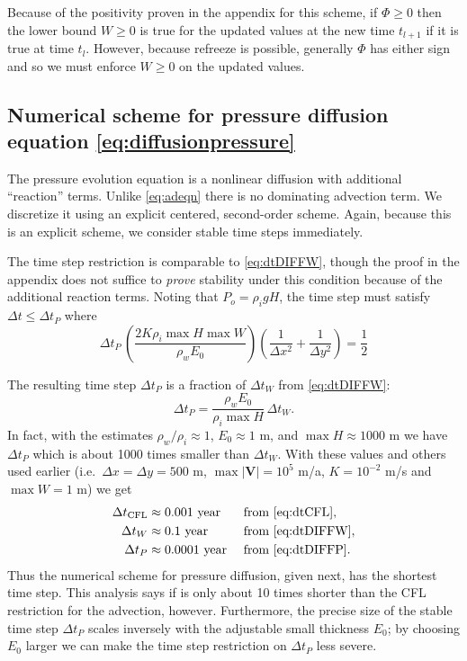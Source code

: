 \documentclass[11pt,final]{amsart}%
\newcommand\bV{\mathbf{V}}
\begin{document}
Because of the positivity proven in the appendix for this scheme, if $\Phi\ge 0$ then the lower bound $W\ge 0$ is true for the updated values at the new time $t_{l+1}$ if it is true at time $t_l$.  However, because refreeze is possible, generally $\Phi$ has either sign and so we must enforce $W\ge 0$ on the updated values.

\subsection*{Numerical scheme for pressure diffusion equation \eqref{eq:diffusionpressure}}  The pressure evolution equation is a nonlinear diffusion with additional ``reaction'' terms.  Unlike \eqref{eq:adeqn} there is no dominating advection term.  We discretize it using an explicit centered, second-order scheme.  Again, because this is an explicit scheme, we consider stable time steps immediately.

The time step restriction is comparable to \eqref{eq:dtDIFFW}, though the proof in the appendix does not suffice to \emph{prove} stability under this condition because of the additional reaction terms.  Noting that $P_o=\rho_i g H$, the time step must satisfy $\Delta t \le \Delta t_P$ where
\begin{equation}
\Delta t_P\, \left(\frac{2 K \rho_i \max H \max W}{\rho_w E_0}\right) \left(\frac{1}{\Delta x^2} + \frac{1}{\Delta y^2}\right) = \frac{1}{2} \label{eq:dtDIFFP}
\end{equation}

The resulting time step $\Delta t_P$ is a fraction of $\Delta t_W$ from \eqref{eq:dtDIFFW}:
\begin{equation}
\Delta t_P = \frac{\rho_w E_0}{\rho_i \max H}\, \Delta t_W.
\end{equation}
In fact, with the estimates $\rho_w/\rho_i \approx 1$, $E_0\approx 1$ m, and $\max H \approx 1000$ m we have $\Delta t_P$ which is about 1000 times smaller than $\Delta t_W$.  With these values and others used earlier (i.e.~$\Delta x = \Delta y = 500$ m, $\max |\bV|=10^5$ m/a, $K=10^{-2}$ m/s and $\max W=1$ m) we get
\begin{align*}
  \Delta t_{\text{CFL}} &\approx 0.001  \text{ year} &&\text{ from \eqref{eq:dtCFL}}, \\
  \Delta t_W            &\approx 0.1    \text{ year} &&\text{ from \eqref{eq:dtDIFFW}}, \\
  \Delta t_P            &\approx 0.0001 \text{ year} &&\text{ from \eqref{eq:dtDIFFP}.}
\end{align*}
Thus the numerical scheme for pressure diffusion, given next, has the shortest time step.  This analysis says if is only about 10 times shorter than the CFL restriction for the advection, however.  Furthermore, the precise size of the stable time step $\Delta t_P$ scales inversely with the adjustable small thickness $E_0$; by choosing $E_0$ larger we can make the time step restriction on $\Delta t_P$ less severe.
\end{document}
